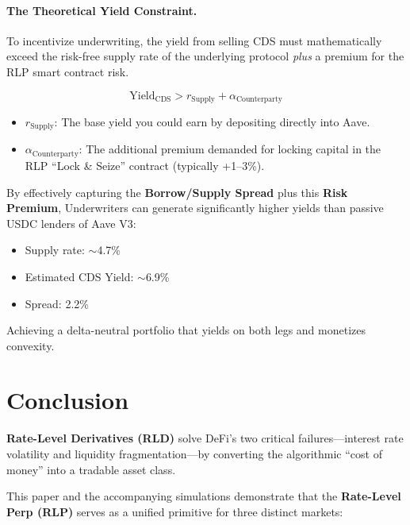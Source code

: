 \documentclass[12pt]{article}
\begin{document}
\paragraph{The Theoretical Yield Constraint.}
To incentivize underwriting, the yield from selling CDS must mathematically exceed the risk-free supply rate of the underlying protocol \emph{plus} a premium for the RLP smart contract risk.

\begin{equation}
    \text{Yield}_{\text{CDS}} > r_{\text{Supply}} + \alpha_{\text{Counterparty}}
\end{equation}

\begin{itemize}
    \item $r_{\text{Supply}}$: The base yield you could earn by depositing directly into Aave.
    \item $\alpha_{\text{Counterparty}}$: The additional premium demanded for locking capital in the RLP ``Lock \& Seize'' contract (typically +1--3\%).
\end{itemize}

By effectively capturing the \textbf{Borrow/Supply Spread} plus this \textbf{Risk Premium}, Underwriters can generate significantly higher yields than passive USDC lenders of Aave V3:

\begin{itemize}
    \item Supply rate: $\sim$4.7\%
    \item Estimated CDS Yield: $\sim$6.9\%
    \item Spread: 2.2\%
\end{itemize}

Achieving a delta-neutral portfolio that yields on both legs and monetizes convexity.

\section{Conclusion}

\textbf{Rate-Level Derivatives (RLD)} solve DeFi's two critical failures---interest rate volatility and liquidity fragmentation---by converting the algorithmic ``cost of money'' into a tradable asset class.

This paper and the accompanying simulations demonstrate that the \textbf{Rate-Level Perp (RLP)} serves as a unified primitive for three distinct markets:
\end{document}
